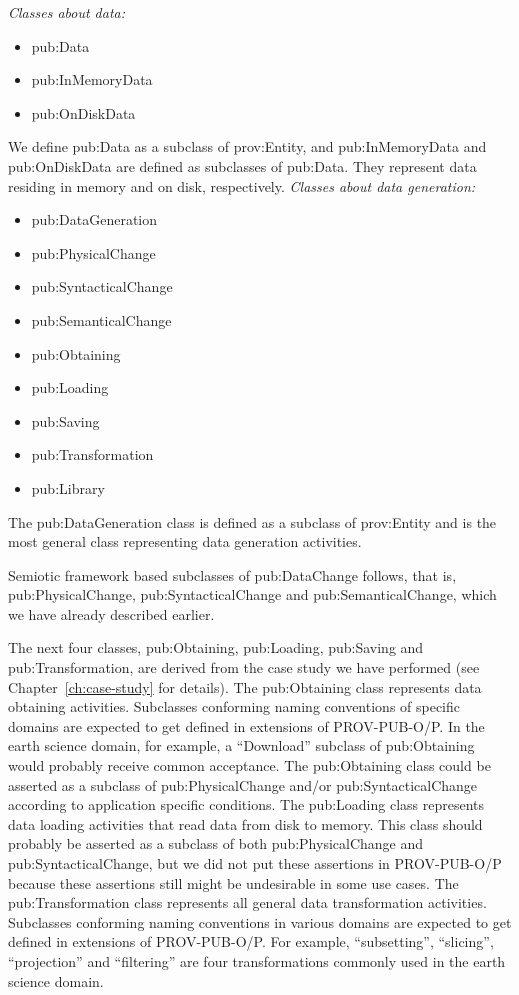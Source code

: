 {\noindent\emph{Classes about data:}}
\begin{itemize}
	\item pub:Data
	\item pub:InMemoryData
	\item pub:OnDiskData
\end{itemize}
We define pub:Data as a subclass of prov:Entity, and pub:InMemoryData and pub:OnDiskData are defined as subclasses of pub:Data. They represent data residing in memory and on disk, respectively.
{\noindent\emph{Classes about data generation:}}
\begin{itemize}
	\item pub:DataGeneration
	\item pub:PhysicalChange
	\item pub:SyntacticalChange
	\item pub:SemanticalChange
	\item pub:Obtaining
	\item pub:Loading
	\item pub:Saving
	\item pub:Transformation
	\item pub:Library
\end{itemize}
The pub:DataGeneration class is defined as a subclass of prov:Entity and is the most general class representing data generation activities. 

Semiotic framework based subclasses of pub:DataChange follows, that is, pub:PhysicalChange, pub:SyntacticalChange and pub:SemanticalChange, which we have already described earlier. 

The next four classes, pub:Obtaining, pub:Loading, pub:Saving and pub:Transformation, are derived from the case study we have performed (see Chapter~\ref{ch:case-study} for details). The pub:Obtaining class represents data obtaining activities. Subclasses conforming naming conventions of specific domains are expected to get defined in extensions of PROV-PUB-O/P. In the earth science domain, for example, a ``Download'' subclass of pub:Obtaining would probably receive common acceptance. The pub:Obtaining class could be asserted as a subclass of pub:PhysicalChange and/or pub:SyntacticalChange according to application specific conditions. The pub:Loading class represents data loading activities that read data from disk to memory. This class should probably be asserted as a subclass of both pub:PhysicalChange and pub:SyntacticalChange, but we did not put these assertions in PROV-PUB-O/P because these assertions still might be undesirable in some use cases. The pub:Transformation class represents all general data transformation activities. Subclasses conforming naming conventions in various domains are expected to get defined in extensions of PROV-PUB-O/P. For example, ``subsetting'', ``slicing'', ``projection'' and ``filtering'' are four transformations commonly used in the earth science domain.

